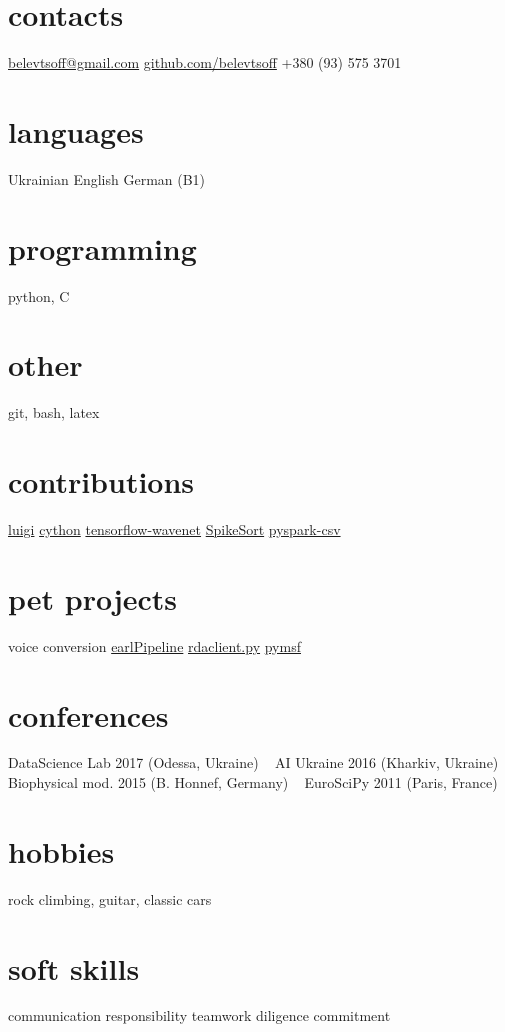 \documentclass[]{cv}
\begin{document}
       {}


\begin{aside}
  \section{contacts}
    \href{mailto:belevtsoff@gmail.com}{belevtsoff@gmail.com}
    \href{https://github.com/belevtsoff}{github.com/belevtsoff}
    +380 (93) 575 3701
  \section{languages}
    Ukrainian
    English
    German (B1)
  \section{programming}
    python, C
  \section{other}
    git, bash, latex
  \section{contributions}
    \href{https://github.com/spotify/luigi}{luigi}
    \href{https://github.com/cython/cython}{cython}
    \href{https://github.com/ibab/tensorflow-wavenet}{tensorflow-wavenet}
    \href{https://github.com/btel/SpikeSort}{SpikeSort}
    \href{https://github.com/seahboonsiew/pyspark-csv}{pyspark-csv}
  \section{pet projects}
    voice conversion
    \href{https://github.com/belevtsoff/earlPipeline}{earlPipeline}
    \href{https://github.com/belevtsoff/rdaclient.py}{rdaclient.py}
    \href{https://github.com/belevtsoff/pymsf}{pymsf}
  \section{conferences}
    DataScience Lab 2017 (Odessa, Ukraine)
    ~
    AI Ukraine 2016 (Kharkiv, Ukraine)
    ~
    Biophysical mod. 2015 (B. Honnef, Germany)
    ~
    EuroSciPy 2011 (Paris, France)
  \section{hobbies}
    rock climbing, guitar, classic cars
  \section{soft skills}
    communication
    responsibility
    teamwork
    diligence
    commitment
\end{aside}
\end{document}
